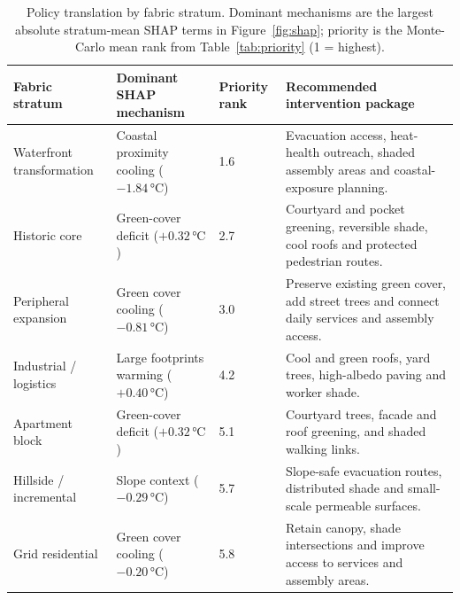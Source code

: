 \begin{table}[htbp]
  \centering\footnotesize
  \caption{Policy translation by fabric stratum. Dominant mechanisms are the
  largest absolute stratum-mean SHAP terms in Figure~\ref{fig:shap}; priority is
  the Monte-Carlo mean rank from Table~\ref{tab:priority} (1 = highest).}
  \label{tab:policy-translation}
  \begin{tabular}{@{}p{}p{}p{}p{}@{}}
    \toprule
    Fabric stratum & Dominant SHAP mechanism & Priority rank & Recommended intervention package \\
    \midrule
    Waterfront transformation & Coastal proximity cooling ($-1.84\,\si{\celsius}$) & 1.6 & Evacuation access, heat-health outreach, shaded assembly areas and coastal-exposure planning. \\
    Historic core & Green-cover deficit ($+0.32\,\si{\celsius}$) & 2.7 & Courtyard and pocket greening, reversible shade, cool roofs and protected pedestrian routes. \\
    Peripheral expansion & Green cover cooling ($-0.81\,\si{\celsius}$) & 3.0 & Preserve existing green cover, add street trees and connect daily services and assembly access. \\
    Industrial / logistics & Large footprints warming ($+0.40\,\si{\celsius}$) & 4.2 & Cool and green roofs, yard trees, high-albedo paving and worker shade. \\
    Apartment block & Green-cover deficit ($+0.32\,\si{\celsius}$) & 5.1 & Courtyard trees, facade and roof greening, and shaded walking links. \\
    Hillside / incremental & Slope context ($-0.29\,\si{\celsius}$) & 5.7 & Slope-safe evacuation routes, distributed shade and small-scale permeable surfaces. \\
    Grid residential & Green cover cooling ($-0.20\,\si{\celsius}$) & 5.8 & Retain canopy, shade intersections and improve access to services and assembly areas. \\
    \bottomrule
  \end{tabular}
\end{table}

